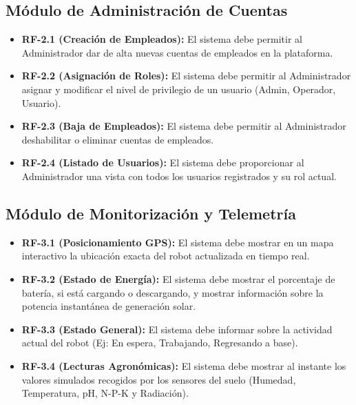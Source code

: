 \subsection{Módulo de Administración de Cuentas}
\begin{itemize}
    \item \textbf{RF-2.1 (Creación de Empleados):} El sistema debe permitir al Administrador dar de alta nuevas cuentas de empleados en la plataforma.
    \item \textbf{RF-2.2 (Asignación de Roles):} El sistema debe permitir al Administrador asignar y modificar el nivel de privilegio de un usuario (Admin, Operador, Usuario).
    \item \textbf{RF-2.3 (Baja de Empleados):} El sistema debe permitir al Administrador deshabilitar o eliminar cuentas de empleados.
    \item \textbf{RF-2.4 (Listado de Usuarios):} El sistema debe proporcionar al Administrador una vista con todos los usuarios registrados y su rol actual.
\end{itemize}

\subsection{Módulo de Monitorización y Telemetría}
\begin{itemize}
    \item \textbf{RF-3.1 (Posicionamiento GPS):} El sistema debe mostrar en un mapa interactivo la ubicación exacta del robot actualizada en tiempo real.
    \item \textbf{RF-3.2 (Estado de Energía):} El sistema debe mostrar el porcentaje de batería, si está cargando o descargando, y mostrar información sobre la potencia instantánea de generación solar.
    \item \textbf{RF-3.3 (Estado General):} El sistema debe informar sobre la actividad actual del robot (Ej: En espera, Trabajando, Regresando a base).
    \item \textbf{RF-3.4 (Lecturas Agronómicas):} El sistema debe mostrar al instante los valores simulados recogidos por los sensores del suelo (Humedad, Temperatura, pH, N-P-K y Radiación).
\end{itemize}

